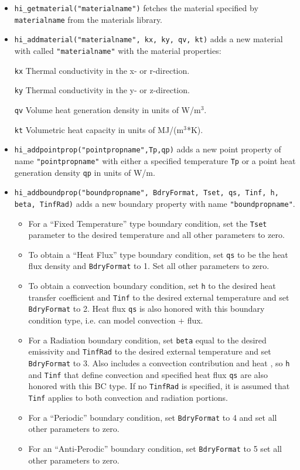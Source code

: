\begin{itemize}
\item \texttt{hi\_getmaterial("materialname")} fetches the material specified by \texttt{materialname} 
from the materials library.

\item \texttt{hi\_addmaterial("materialname", kx, ky, qv, kt)} adds a new material with
called \texttt{"materialname"} with the material properties:

\texttt{kx} Thermal conductivity in the x- or r-direction.

\texttt{ky} Thermal conductivity in the y- or z-direction.

\texttt{qv} Volume heat generation density in units of W/m$^{3}$.

\texttt{kt} Volumetric heat capacity in units of MJ/(m$^{3}$*K).

\item \texttt{hi\_addpointprop("pointpropname",Tp,qp)} adds a new point property of
name \texttt{"pointpropname"} with either a specified temperature
\texttt{Tp} or a point heat generation density \texttt{qp} in units of W/m.

\item \texttt{hi\_addboundprop("boundpropname", BdryFormat, Tset, qs, Tinf, h, beta, TinfRad)}
 adds a new boundary property with name {\tt "boundpropname"}.
\begin{itemize}
\item For a ``Fixed Temperature'' type boundary condition, set the {\tt Tset} parameter to the
desired temperature and all other parameters to zero.
\item To obtain a ``Heat Flux'' type boundary condition, set {\tt qs} to be the heat flux density and
{\tt BdryFormat} to 1. Set all other parameters to zero.
\item To obtain a convection boundary condition, set {\tt h} to the desired heat transfer coefficient and
{\tt Tinf} to the desired external temperature and set {\tt BdryFormat} to 2.  Heat flux {\tt qs} is also honored with this boundary
condition type, i.e. can model convection + flux.
\item For a Radiation boundary condition, set {\tt beta} equal to the desired emissivity and {\tt TinfRad} to the 
desired external temperature and set {\tt BdryFormat} to 3. Also includes a convection contribution and heat , so {\tt h} and {\tt Tinf} that define convection and specified heat flux {\tt qs} are also honored with this BC type.  If no {\tt TinfRad} is specified, it is assumed that {\tt Tinf} applies to both convection and radiation portions.
\item For a ``Periodic'' boundary condition, set {\tt BdryFormat} to 4 and set all other
parameters to zero.
\item For an ``Anti-Perodic'' boundary condition, set {\tt BdryFormat} to 5 set all other
parameters to zero.
\end{itemize}


\end{itemize}
